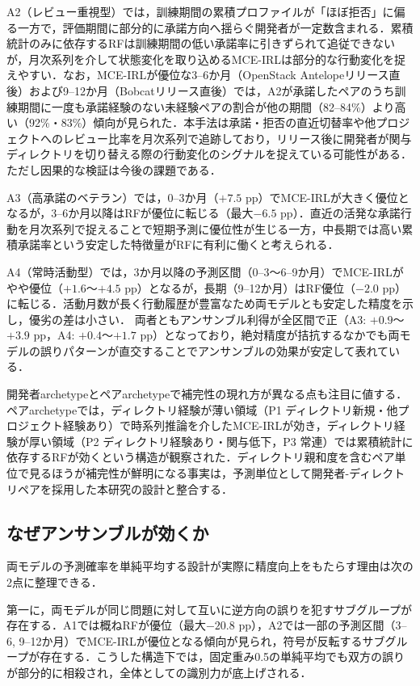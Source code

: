\documentclass[submit,noauthor,ses,dvipdfmx]{ipsj}
\begin{document}
A2（レビュー重視型）では，訓練期間の累積プロファイルが「ほぼ拒否」に偏る一方で，評価期間に部分的に承諾方向へ揺らぐ開発者が一定数含まれる．累積統計のみに依存するRFは訓練期間の低い承諾率に引きずられて追従できないが，月次系列を介して状態変化を取り込めるMCE-IRLは部分的な行動変化を捉えやすい．なお，MCE-IRLが優位な3--6か月（OpenStack Antelopeリリース直後）および9--12か月（Bobcatリリース直後）では，A2が承諾したペアのうち訓練期間に一度も承諾経験のない未経験ペアの割合が他の期間（82--84\%）より高い（92\%・83\%）傾向が見られた．本手法は承諾・拒否の直近切替率や他プロジェクトへのレビュー比率を月次系列で追跡しており，リリース後に開発者が関与ディレクトリを切り替える際の行動変化のシグナルを捉えている可能性がある．ただし因果的な検証は今後の課題である．

A3（高承諾のベテラン）では，0--3か月（$+7.5$ pp）でMCE-IRLが大きく優位となるが，3--6か月以降はRFが優位に転じる（最大$-6.5$ pp）．直近の活発な承諾行動を月次系列で捉えることで短期予測に優位性が生じる一方，中長期では高い累積承諾率という安定した特徴量がRFに有利に働くと考えられる．

A4（常時活動型）では，3か月以降の予測区間（0--3〜6--9か月）でMCE-IRLがやや優位（$+1.6$〜$+4.5$ pp）となるが，長期（9--12か月）はRF優位（$-2.0$ pp）に転じる．活動月数が長く行動履歴が豊富なため両モデルとも安定した精度を示し，優劣の差は小さい．
両者ともアンサンブル利得が全区間で正（A3: $+0.9$〜$+3.9$ pp，A4: $+0.4$〜$+1.7$ pp）となっており，絶対精度が拮抗するなかでも両モデルの誤りパターンが直交することでアンサンブルの効果が安定して表れている．

開発者archetypeとペアarchetypeで補完性の現れ方が異なる点も注目に値する．ペアarchetypeでは，ディレクトリ経験が薄い領域（P1 ディレクトリ新規・他プロジェクト経験あり）で時系列推論を介したMCE-IRLが効き，ディレクトリ経験が厚い領域（P2 ディレクトリ経験あり・関与低下，P3 常連）では累積統計に依存するRFが効くという構造が観察された．ディレクトリ親和度を含むペア単位で見るほうが補完性が鮮明になる事実は，予測単位として開発者-ディレクトリペアを採用した本研究の設計と整合する．

\subsection{なぜアンサンブルが効くか}
両モデルの予測確率を単純平均する設計が実際に精度向上をもたらす理由は次の2点に整理できる．

第一に，両モデルが同じ問題に対して互いに逆方向の誤りを犯すサブグループが存在する．A1では概ねRFが優位（最大$-20.8$ pp），A2では一部の予測区間（3--6, 9--12か月）でMCE-IRLが優位となる傾向が見られ，符号が反転するサブグループが存在する．こうした構造下では，固定重み0.5の単純平均でも双方の誤りが部分的に相殺され，全体としての識別力が底上げされる．
\end{document}
